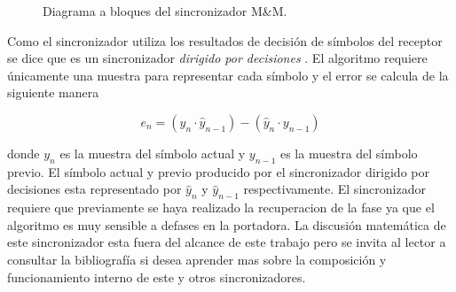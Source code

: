 \begin{figure}[htp]
  \centering
  \vspace{0.5in}
  \vspace{0.3in}
  \caption{Diagrama a bloques del sincronizador M\&M. \protect\cite{meyr}}
  \label{fig:mm}
\end{figure}

Como el sincronizador utiliza los resultados de decisi\'on de s\'imbolos del receptor se dice que es un sincronizador
\emph{dirigido por decisiones} \cite{louis}. El algoritmo requiere \'unicamente una muestra para representar cada s\'imbolo y el
error se calcula de la siguiente manera

\begin{equation}
e_n=(y_n \cdot \hat{y}_{n-1}) - (\hat{y}_n \cdot y_{n-1})
\end{equation}

donde $y_n$ es la muestra del s\'imbolo actual y $y_{n-1}$ es la muestra del s\'imbolo previo. El s\'imbolo actual y previo producido por el sincronizador
dirigido por decisiones esta representado por $\hat{y}_n$ y $\hat{y}_{n-1}$ respectivamente.
El sincronizador requiere que previamente se haya realizado la recuperacion de la fase ya que el algoritmo es muy sensible a defases en la portadora. La
discusi\'on matem\'atica de este sincronizador esta fuera del alcance de este trabajo pero se invita al lector a consultar la
bibliograf\'ia si desea aprender mas sobre la composici\'on y funcionamiento interno de este y otros sincronizadores. 

